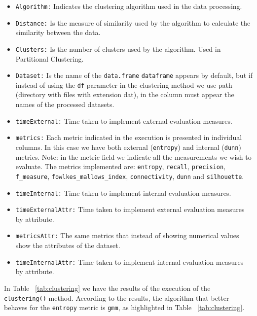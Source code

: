 \begin{itemize}
  \item \texttt{Algorithm:} Indicates the clustering algorithm used in the data processing.
  \item \texttt{Distance:} Is the measure of similarity used by the algorithm to calculate the similarity between the data.
  \item \texttt{Clusters:} Is the number of clusters used by the algorithm. Used in Partitional Clustering.
  \item \texttt{Dataset:} Is the name of the \texttt{data.frame} \texttt{dataframe} appears by default, but if instead of using the \texttt{df} parameter in the clustering method we use path (directory with files with extension dat), in the column must appear the names of the processed datasets.
  \item \texttt{timeExternal:} Time taken to implement external evaluation measures.
  \item \texttt{metrics:} Each metric indicated in the execution is presented in individual columns. In this case we have both external (\texttt{entropy}) and internal (\texttt{dunn}) metrics.
  Note: in the metric field we indicate all the measurements we wish to evaluate. The metrics implemented are: \texttt{entropy}, \texttt{recall}, \texttt{precision}, \texttt{f\_measure}, \texttt{fowlkes\_mallows\_index}, \texttt{connectivity}, \texttt{dunn} and \texttt{silhouette}.
  \item \texttt{timeInternal:} Time taken to implement internal evaluation measures.
  \item \texttt{timeExternalAttr:} Time taken to implement external evaluation measures by attribute.
  \item \texttt{metricsAttr:} The same metrics that instead of showing numerical values show the attributes of the dataset.
  \item \texttt{timeInternalAttr:} Time taken to implement internal evaluation measures by attribute.
\end{itemize}
In Table ~\ref{tab:clustering} we have the results of the execution of the \texttt{clustering()} method. According to the results, the algorithm that better behaves for the \texttt{entropy} metric is \texttt{gmm}, as highlighted in Table ~\ref{tab:clustering}.
\clearpage
